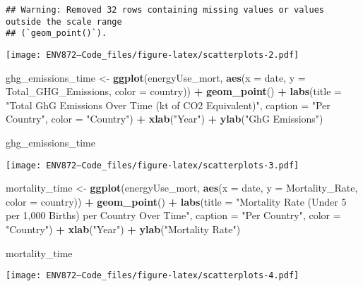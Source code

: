 \documentclass[
]{article}
\newenvironment{Shaded}{\begin{snugshade}}{\end{snugshade}}
\newcommand{\AttributeTok}[1]{\textcolor[rgb]{0.13,0.29,0.53}{#1}}
\newcommand{\FunctionTok}[1]{\textcolor[rgb]{0.13,0.29,0.53}{\textbf{#1}}}
\newcommand{\NormalTok}[1]{#1}
\newcommand{\OtherTok}[1]{\textcolor[rgb]{0.56,0.35,0.01}{#1}}
\newcommand{\SpecialCharTok}[1]{\textcolor[rgb]{0.81,0.36,0.00}{\textbf{#1}}}
\newcommand{\StringTok}[1]{\textcolor[rgb]{0.31,0.60,0.02}{#1}}
\begin{document}
\begin{verbatim}
## Warning: Removed 32 rows containing missing values or values outside the scale range
## (`geom_point()`).
\end{verbatim}

\texttt{[image: ENV872---Code\_files/figure-latex/scatterplots-2.pdf]}

\begin{Shaded}
\begin{Highlighting}[]
\NormalTok{ghg\_emissions\_time }\OtherTok{\textless{}{-}} \FunctionTok{ggplot}\NormalTok{(energyUse\_mort, }\FunctionTok{aes}\NormalTok{(}\AttributeTok{x =}\NormalTok{ date,}
    \AttributeTok{y =}\NormalTok{ Total\_GHG\_Emissions, }\AttributeTok{color =}\NormalTok{ country)) }\SpecialCharTok{+}
    \FunctionTok{geom\_point}\NormalTok{() }\SpecialCharTok{+} \FunctionTok{labs}\NormalTok{(}\AttributeTok{title =} \StringTok{"Total GhG Emissions Over Time (kt of CO2 Equivalent)"}\NormalTok{,}
    \AttributeTok{caption =} \StringTok{"Per Country"}\NormalTok{, }\AttributeTok{color =} \StringTok{"Country"}\NormalTok{) }\SpecialCharTok{+}
    \FunctionTok{xlab}\NormalTok{(}\StringTok{"Year"}\NormalTok{) }\SpecialCharTok{+} \FunctionTok{ylab}\NormalTok{(}\StringTok{"GhG Emissions"}\NormalTok{)}

\NormalTok{ghg\_emissions\_time}
\end{Highlighting}
\end{Shaded}

\texttt{[image: ENV872---Code\_files/figure-latex/scatterplots-3.pdf]}

\begin{Shaded}
\begin{Highlighting}[]
\NormalTok{mortality\_time }\OtherTok{\textless{}{-}} \FunctionTok{ggplot}\NormalTok{(energyUse\_mort, }\FunctionTok{aes}\NormalTok{(}\AttributeTok{x =}\NormalTok{ date,}
    \AttributeTok{y =}\NormalTok{ Mortality\_Rate, }\AttributeTok{color =}\NormalTok{ country)) }\SpecialCharTok{+} \FunctionTok{geom\_point}\NormalTok{() }\SpecialCharTok{+}
    \FunctionTok{labs}\NormalTok{(}\AttributeTok{title =} \StringTok{"Mortality Rate (Under 5 per 1,000 Births) per Country Over Time"}\NormalTok{,}
        \AttributeTok{caption =} \StringTok{"Per Country"}\NormalTok{, }\AttributeTok{color =} \StringTok{"Country"}\NormalTok{) }\SpecialCharTok{+}
    \FunctionTok{xlab}\NormalTok{(}\StringTok{"Year"}\NormalTok{) }\SpecialCharTok{+} \FunctionTok{ylab}\NormalTok{(}\StringTok{"Mortality Rate"}\NormalTok{)}

\NormalTok{mortality\_time}
\end{Highlighting}
\end{Shaded}

\texttt{[image: ENV872---Code\_files/figure-latex/scatterplots-4.pdf]}
\end{document}
